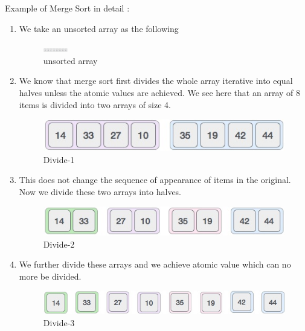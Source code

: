 Example of Merge Sort in detail\cite{am007} :
\begin{enumerate}
    \item  We take an unsorted array as the following 
 \begin{figure}[htp]%
    \centre%
    \includegraphics[width=0.1\textwidth]{images/ch4/unsorted_array.jpg}%
    \caption[unsorted array]{unsorted array}\label{fig:unsorted array}%
  \end{figure}

\item We know that merge sort first divides the whole array iterative into equal halves unless the atomic values are achieved. We see here that an array of 8 items is divided into two arrays of size 4.
\begin{figure}[htp]%
    \centre%
    \includegraphics[width=1\textwidth]{images/ch4/merge_sort_divide_1.jpg}%
    \caption[Merge Sort divide-1]{Divide-1}\label{fig:divide}%
  \end{figure}
  
\item This does not change the sequence of appearance of items in the original. Now we divide these two arrays into halves.
\begin{figure}[htp]%
    \centre%
    \includegraphics[width=1\textwidth]{images/ch4/merge_sort_divide_2.jpg}%
    \caption[Merge Sort divide-1]{Divide-2}\label{fig:Integration with google-map}%
  \end{figure}

\item We further divide these arrays and we achieve atomic value which can no more be divided.
\begin{figure}[htp]%
    \centre%
    \includegraphics[width=1\textwidth]{images/ch4/merge_sort_divide_3.jpg}%
    \caption[Merge Sort divide-3]{Divide-3}\label{fig:Integration with google-map}%
  \end{figure}


\end{enumerate}
